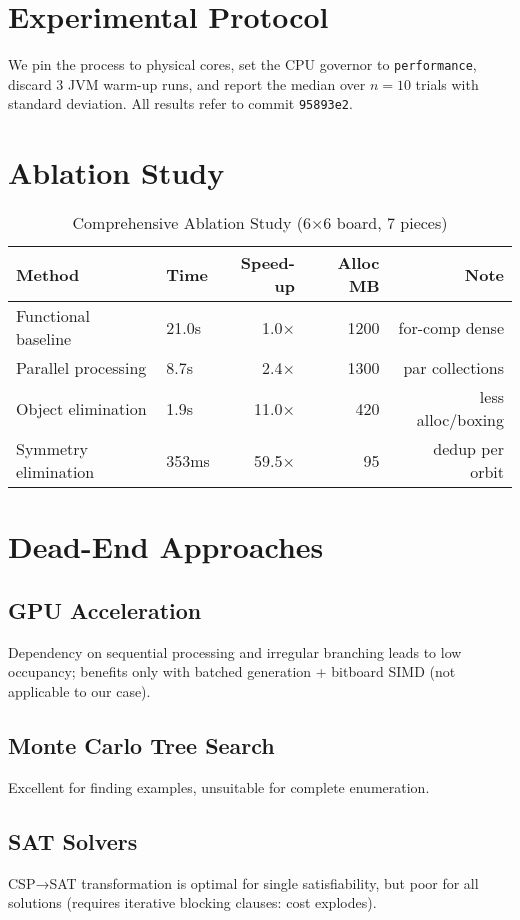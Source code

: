 \documentclass[12pt,a4paper]{article}
\theoremstyle{definition}
\begin{document}
\section{Experimental Protocol}

We pin the process to physical cores, set the CPU governor to \texttt{performance}, discard 3 JVM warm-up runs, and report the median over $n=10$ trials with standard deviation. All results refer to commit \texttt{95893e2}.

\section{Ablation Study}

\begin{table}[h]
\centering
\caption{Comprehensive Ablation Study (6$\times$6 board, 7 pieces)}
\begin{tabular}{@{}llrrr@{}}
\toprule
Method & Time & Speed-up & Alloc MB & Note \\
\midrule
Functional baseline & 21.0s & 1.0× & 1200 & for-comp dense \\
Parallel processing & 8.7s & 2.4× & 1300 & par collections \\
Object elimination & 1.9s & 11.0× & 420 & less alloc/boxing \\
Symmetry elimination & 353ms & 59.5× & 95 & dedup per orbit \\
\bottomrule
\end{tabular}
\end{table}

\section{Dead-End Approaches}

\subsection{GPU Acceleration}
Dependency on sequential processing and irregular branching leads to low occupancy; benefits only with batched generation + bitboard SIMD (not applicable to our case).

\subsection{Monte Carlo Tree Search}
Excellent for finding examples, unsuitable for complete enumeration.

\subsection{SAT Solvers}
CSP→SAT transformation is optimal for single satisfiability, but poor for all solutions (requires iterative blocking clauses: cost explodes).
\end{document}
